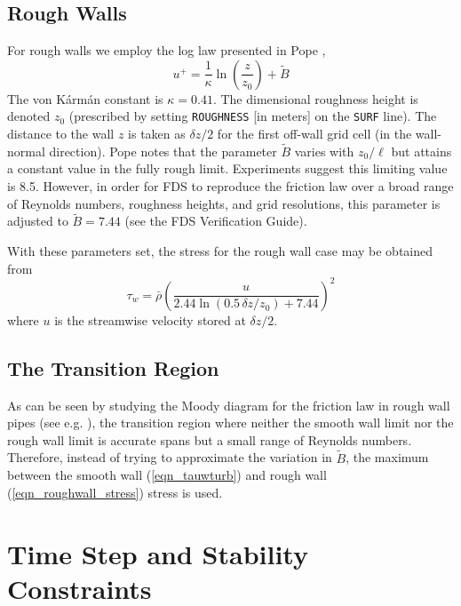 \subsection{Rough Walls}
\label{rough_wall_model}

For rough walls we employ the log law presented in Pope \cite{Pope:2000},
\begin{equation}
\label{eqn_roughwallloglaw}
u^+ = \frac{1}{\kappa} \ln \left(\frac{z}{z_0}\right) + \tilde{B}
\end{equation}
The von K\'{a}rm\'{a}n constant is $\kappa=0.41$.  The dimensional roughness height is denoted $z_0$ (prescribed by setting {\tt ROUGHNESS} [in meters] on the {\tt SURF} line). The distance to the wall $z$ is taken as $\delta z/2$ for the first off-wall grid cell (in the wall-normal direction).  Pope notes that the parameter $\tilde{B}$ varies with $z_0/\ell$ but attains a constant value in the fully rough limit.  Experiments suggest this limiting value is 8.5.  However, in order for FDS to reproduce the friction law over a broad range of Reynolds numbers, roughness heights, and grid resolutions, this parameter is adjusted to $\tilde{B} = 7.44$ (see the FDS Verification Guide).

With these parameters set, the stress for the rough wall case may be obtained from
\begin{equation}
\label{eqn_roughwall_stress}
\tau_w = \bar{\rho} \left( \frac{u}{2.44 \ln (0.5\,\delta z/z_0) + 7.44} \right)^2
\end{equation}
where $u$ is the streamwise velocity stored at $\delta z/2$.

\subsection{The Transition Region}

As can be seen by studying the Moody diagram for the friction law in rough wall pipes (see e.g. \cite{Pope:2000,MYO}), the transition region where neither the smooth wall limit nor the rough wall limit is accurate spans but a small range of Reynolds numbers.  Therefore, instead of trying to approximate the variation in $\tilde{B}$, the maximum between the smooth wall (\ref{eqn_tauwturb}) and rough wall (\ref{eqn_roughwall_stress}) stress is used.

\section{Time Step and Stability Constraints}

